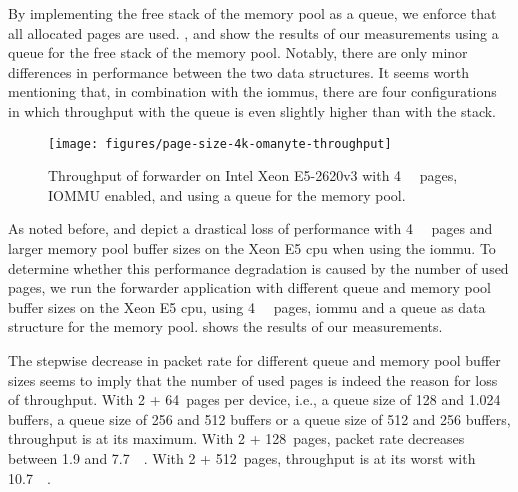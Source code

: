 By implementing the free stack of the memory pool as a queue, we enforce that
all allocated pages are used. ,
 and
 show the results of our measurements
using a queue for the free stack of the memory pool. Notably, there are only
minor differences in performance between the two data structures. It seems worth
mentioning that, in combination with the \acp{iommu}, there are four
configurations in which throughput with the queue is even slightly higher than
with the stack.

\begin{figure}%
	\centering
    \texttt{[image: figures/page-size-4k-omanyte-throughput]}

    \caption{Throughput of forwarder on Intel Xeon E5-2620v3 with
    \SI{4}{\kibi\byte} pages, IOMMU enabled, and using a queue for the memory
    pool.}
	\label{fig:page-size-4k-omanyte}
\end{figure}

As noted before,  and
 depict a drastical loss of performance
with \SI{4}{\kibi\byte} pages and larger memory pool buffer sizes on the Xeon E5
\ac{cpu} when using the \ac{iommu}. To determine whether this performance
degradation is caused by the number of used pages, we run the forwarder
application with different queue and memory pool buffer sizes on the Xeon E5
\ac{cpu}, using \SI{4}{\kibi\byte} pages, \ac{iommu} and a queue as data
structure for the memory pool.  shows the
results of our measurements.

The stepwise decrease in packet rate for different queue and memory pool buffer
sizes seems to imply that the number of used pages is indeed the reason for loss
of throughput. With 2 + 64~pages per device, i.e., a queue size of 128 and
\SI{1,024}{\byte} buffers, a queue size of 256 and \SI{512}{\byte} buffers or a
queue size of 512 and \SI{256}{\byte} buffers, throughput is at its maximum.
With 2 + 128~pages, packet rate decreases between 1.9 and \SI{7.7}{\mega\pps}.
With 2 + 512~pages, throughput is at its worst with \SI{10.7}{\mega\pps}.

